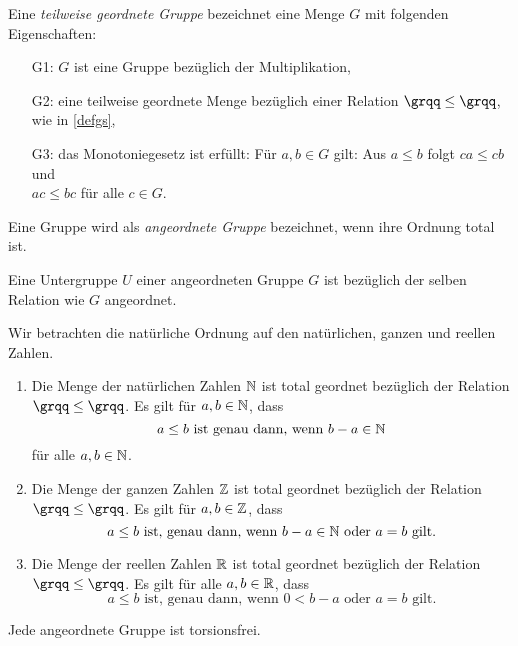 %
\begin{defn}\label{twgG} %
Eine \textit{teilweise geordnete Gruppe} bezeichnet eine Menge $G$ mit folgenden Eigenschaften: 
%
\begin{enumerate}
\item[G1:] $G$ ist eine Gruppe bezüglich der Multiplikation,
\item[G2:] eine teilweise geordnete Menge bezüglich einer Relation $ \grqq\leq\grqq $, wie in \ref{defgs}, 
\item[G3:] das Monotoniegesetz ist erfüllt: Für $a, b \in  G$ gilt: Aus $a \leq b$ folgt $ca \leq  cb$ und \\ $ac \leq bc$ für alle $c \in G$.
\end{enumerate}
% 
\end{defn}
%
%
\begin{defn}\label{agG}
Eine Gruppe wird als \textit{angeordnete Gruppe} bezeichnet, wenn ihre Ordnung total ist.
\end{defn}
%
%
%
\begin{bsp}
Eine Untergruppe $U$ einer angeordneten Gruppe $G$ ist bezüglich der selben Relation wie $G$ angeordnet.
\end{bsp}
%
\begin{bsp}\label{OrdnungNundZ}
Wir betrachten die natürliche Ordnung auf den natürlichen, ganzen und reellen Zahlen.
\begin{enumerate}
\item Die Menge der natürlichen Zahlen $\mathbb{N}$ ist total geordnet bezüglich der Relation $\grqq\leq\grqq$. Es gilt für $a, b \in \mathbb{N}$, dass
\[ a \leq b \text{ ist genau dann, wenn } b-a \in \mathbb{N}
\]
für alle $a,b \in \mathbb{N}$.
\item Die Menge der ganzen Zahlen $\mathbb{Z}$ ist total geordnet bezüglich der Relation $\grqq\leq\grqq$. Es gilt für $a, b \in \mathbb{Z}$, dass
\[ a\leq b \text{ ist, genau dann, wenn } b -a \in \mathbb{N} \text{ oder } a = b \text{ gilt.}
\]
\item Die Menge der reellen Zahlen $\mathbb{R}$ ist total geordnet bezüglich der Relation $\grqq\leq\grqq$. Es gilt für alle $a, b \in \mathbb{R}$, dass
\[a \leq b \text{ ist, genau dann, wenn } 0 < b -a \text{ oder } a = b \text{ gilt.} 
\]
\end{enumerate}
\end{bsp}
%
% 
%
%
\begin{satz} \label{angeordnetFolgtTorsionsfrei} %
Jede angeordnete Gruppe ist torsionsfrei. 
\end{satz}
%
